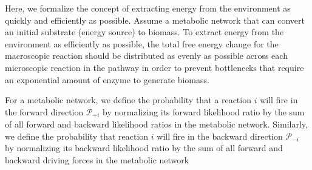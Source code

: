 Here, we formalize the concept of extracting energy from the environment as quickly and efficiently as possible. Assume a metabolic network that can convert an initial substrate (energy source) to biomass. To extract energy from the environment as efficiently as possible, the total free energy change for the macroscopic reaction should be distributed as evenly as possible across each microscopic reaction in the pathway in order to prevent bottlenecks that require an exponential amount of enzyme to generate biomass.


For a metabolic network, we define the probability that a reaction $i$ will fire in the forward  direction ${\mathcal P_{+i}}$ by normalizing its forward likelihood ratio by the sum of all forward and backward likelihood ratios in the metabolic network. Similarly, we define the probability that reaction $i$ will fire in the backward direction $\mathcal P_{-i}$ by normalizing its backward likelihood ratio by  the sum of all forward and backward driving forces in the metabolic network